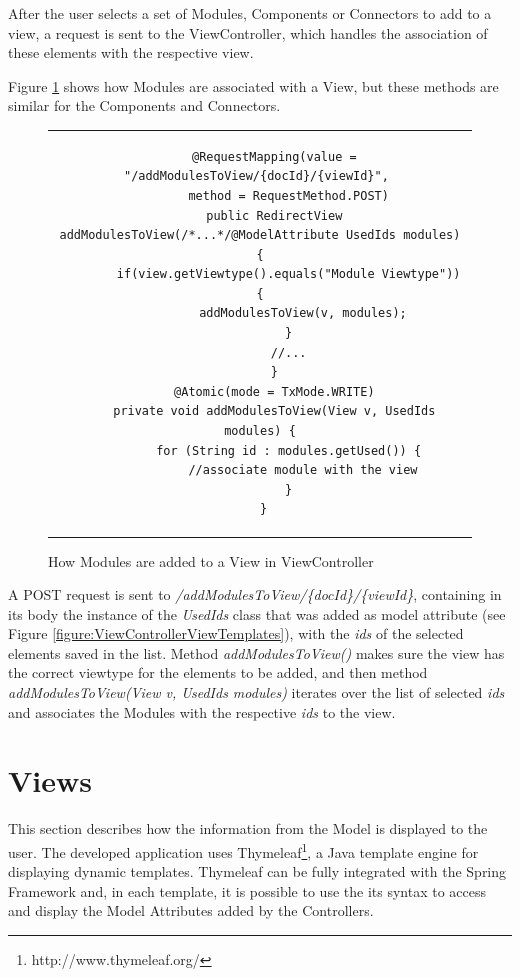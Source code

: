 After the user selects a set of Modules, Components or Connectors to add to a view, a request is sent to the ViewController, which handles the association of these elements with the respective view.

Figure \ref{figure:ViewControllerAddModules} shows how Modules are associated with a View, but these methods are similar for the Components and Connectors. 
\begin{figure}[h]
\centering
\lstset{style=customjava}
\begin{tabular}{c}
\begin{lstlisting}
	@RequestMapping(value = "/addModulesToView/{docId}/{viewId}", 
		method = RequestMethod.POST)
	public RedirectView addModulesToView(/*...*/@ModelAttribute UsedIds modules) {
		if(view.getViewtype().equals("Module Viewtype")) {
			addModulesToView(v, modules);
		}
		//...
	}
	@Atomic(mode = TxMode.WRITE)
	private void addModulesToView(View v, UsedIds modules) {
		for (String id : modules.getUsed()) {
			//associate module with the view
		}
	}	
\end{lstlisting}
\end{tabular}
\caption{How Modules are added to a View in ViewController}
\label{figure:ViewControllerAddModules}
\end{figure}
A POST request is sent to \textit{/addModulesToView/\{docId\}/\{viewId\}}, containing in its body the instance of the \textit{UsedIds} class that was added as model attribute (see Figure \ref{figure:ViewControllerViewTemplates}), with the \textit{ids} of the selected elements saved in the list. Method \textit{addModulesToView()} makes sure the view has the correct viewtype for the elements to be added, and then method \textit{addModulesToView(View v, UsedIds modules)} iterates over the list of selected \textit{ids} and associates the Modules with the respective \textit{ids} to the view.

\section{Views}
\label{section:Views}
This section describes how the information from the Model is displayed to the user. The developed application uses Thymeleaf\footnote{http://www.thymeleaf.org/}, a Java template engine for displaying dynamic templates. Thymeleaf can be fully integrated with the Spring Framework and, in each template, it is possible to use the its syntax to access and display the Model Attributes added by the Controllers. 

